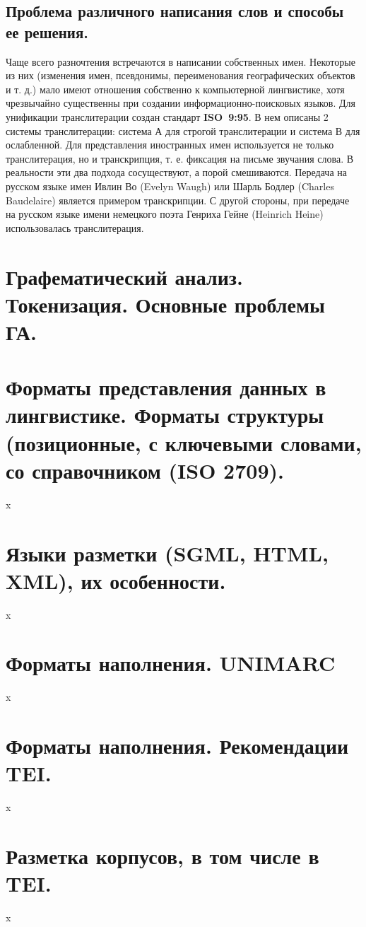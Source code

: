 \documentclass[12pt]{article}
\theoremstyle{definition}
\theoremstyle{remark}
\numberwithin{equation}{section}
\begin{document}
\subsection{Проблема различного написания слов и способы ее решения.}
Чаще всего разночтения встречаются в написании собственных имен. Некоторые из них (изменения имен, псевдонимы, переименования географических объектов и т. д.) мало имеют отношения собственно к компьютерной лингвистике, хотя чрезвычайно существенны при создании информационно\nobreakdash-поисковых языков.
Для унификации транслитерации создан стандарт \textbf{ISO~9:95}. В нем описаны 2 системы транслитерации: система А для строгой транслитерации и система В для ослабленной.
Для представления иностранных имен используется не только транслитерация, но и транскрипция, т. е. фиксация на письме звучания слова. В реальности эти два подхода сосуществуют, а порой смешиваются.
Передача на русском языке имен Ивлин Во (Evelyn Waugh) или Шарль Бодлер (Charles Baudelaire) является примером транскрипции. С другой стороны, при передаче на русском языке имени немецкого поэта Генриха Гейне (Heinrich Heine) использовалась транслитерация.

\section{Графематический анализ. Токенизация. Основные проблемы ГА.}

\section{Форматы представления данных в лингвистике. Форматы структуры (позиционные, с ключевыми словами, со справочником (ISO 2709).}
x
\section{Языки разметки (SGML, HTML, XML), их особенности.}
x
\section{Форматы наполнения. UNIMARC}
x
\section{Форматы наполнения. Рекомендации TEI.}
x
\section{Разметка корпусов, в том числе в TEI.}
x
\end{document}
